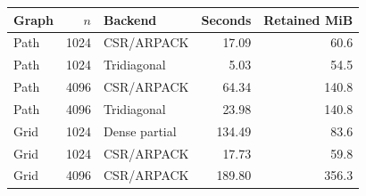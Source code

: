 \begin{tabular}{lrlrr}\toprule
Graph & $n$ & Backend & Seconds & Retained MiB\\\midrule
Path & 1024 & CSR/ARPACK & 17.09 & 60.6 \\
Path & 1024 & Tridiagonal & 5.03 & 54.5 \\
Path & 4096 & CSR/ARPACK & 64.34 & 140.8 \\
Path & 4096 & Tridiagonal & 23.98 & 140.8 \\
Grid & 1024 & Dense partial & 134.49 & 83.6 \\
Grid & 1024 & CSR/ARPACK & 17.73 & 59.8 \\
Grid & 4096 & CSR/ARPACK & 189.80 & 356.3 \\
\bottomrule\end{tabular}
